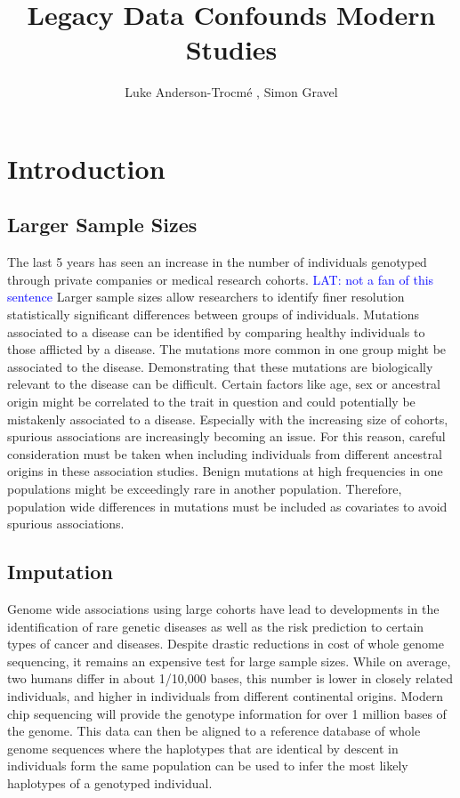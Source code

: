 \documentclass[12pt]{amsart}
\title{Legacy Data Confounds Modern Studies}
\author{Luke Anderson-Trocm\'e , Simon Gravel}
\newcommand{\lat}[1]{\textcolor{blue}{LAT: #1}}
\begin{document}
\maketitle
\tableofcontents
\clearpage
			\section{Introduction}
\subsection{Larger Sample Sizes}			
The last 5 years has seen an increase in the number of individuals genotyped through private companies or medical research cohorts. 
\lat{not a fan of this sentence}
Larger sample sizes allow researchers to identify finer resolution statistically significant differences between groups of individuals. 
Mutations associated to a disease can be identified by comparing healthy individuals to those afflicted by a disease. 
The mutations more common in one group might be associated to the disease.
Demonstrating that these mutations are biologically relevant to the disease can be difficult.
Certain factors like age, sex or ancestral origin might be correlated to the trait in question and could potentially be mistakenly associated to a disease. 
Especially with the increasing size of cohorts, spurious associations are increasingly becoming an issue. 
For this reason, careful consideration must be taken when including individuals from different ancestral origins in these association studies. 
Benign mutations at high frequencies in one populations might be exceedingly rare in another population. 
Therefore, population wide differences in mutations must be included as covariates to avoid spurious associations.

\subsection{Imputation}
Genome wide associations using large cohorts have lead to developments in the identification of rare genetic diseases as well as the risk prediction to certain types of cancer and diseases. 
Despite drastic reductions in cost of whole genome sequencing, it remains an expensive test for large sample sizes.
While on average, two humans differ in about 1/10,000 bases, this number is lower in closely related individuals, and higher in individuals from different continental origins.
Modern chip sequencing will provide the genotype information for over 1 million bases of the genome.
This data can then be aligned to a reference database of whole genome sequences where the haplotypes that are identical by descent in individuals form the same population can be used to infer the most likely haplotypes of a genotyped individual.
\end{document}
